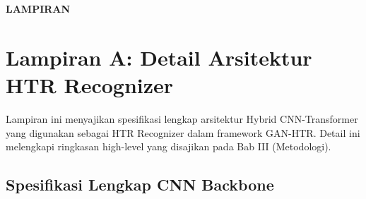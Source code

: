 \documentclass[12pt,a4paper]{article}
\begin{document}
\vspace{2cm}
\begin{center}
{\fontsize{14}{16.8}\selectfont\textbf{LAMPIRAN}}\\[1em]
\end{center}
\label{sec:appendix}
\vspace{2em}


\section{Lampiran A: Detail Arsitektur HTR Recognizer}
\label{appendix:recognizer-architecture}

Lampiran ini menyajikan spesifikasi lengkap arsitektur Hybrid CNN-Transformer yang digunakan sebagai HTR Recognizer dalam framework GAN-HTR. Detail ini melengkapi ringkasan high-level yang disajikan pada Bab III (Metodologi).

\subsection{Spesifikasi Lengkap CNN Backbone}
\end{document}
